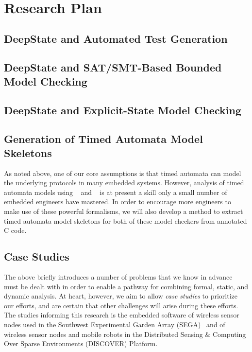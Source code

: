 \section{Research Plan}

%

\subsection{DeepState and Automated Test Generation}
\label{sec:framac2deepstate}


\subsection{DeepState and SAT/SMT-Based Bounded Model Checking}


\subsection{DeepState and Explicit-State Model Checking}


\subsection{Generation of Timed Automata Model Skeletons}
As noted above, one of our core assumptions is that timed automata can
model the underlying protocols in many embedded systems.  However,
analysis of timed automata models using \uppaal~\cite{uppaal} and
\prism~\cite{KNP2011:CAV} is at present a skill only a small number of
embedded engineers have mastered.  In order to encourage more
engineers to make use of these powerful formalisms, we will also
develop a method to extract timed automata model skeletons for both of these
model checkers from annotated C code.  

\subsection{Case Studies} %
\label{sec:case-study}

The above briefly introduces a number of problems that we know in advance must
be dealt with in order to enable a pathway for combining formal,
static, and dynamic analysis.    At heart, however, we aim to allow
\emph{case studies} to prioritize our efforts, and
are certain that other challenges will arise during these efforts.
The studies informing this research is the embedded software of wireless sensor nodes used in the Southwest Experimental Garden Array (SEGA)~\cite{ClaEtAl11,GhoEtAl2014,BelEtAl2015} and of wireless sensor nodes and mobile robots in the Distributed Sensing \& Computing Over Sparse Environments (DISCOVER) Platform.

